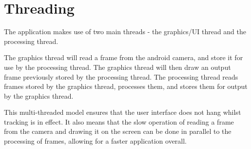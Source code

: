 \section{Threading}

The application makes use of two main threads - the graphics/UI thread and the processing thread.

The graphics thread will read a frame from the android camera, and store it for use by the processing thread. The graphics thread will then draw an output frame previously stored by the processing thread. The processing thread reads frames stored by the graphics thread, processes them, and stores them for output by the graphics thread.

This multi-threaded model ensures that the user interface does not hang whilst tracking is in effect. It also means that the slow operation of reading a frame from the camera and drawing it on the screen can be done in parallel to the processing of frames, allowing for a faster application overall.